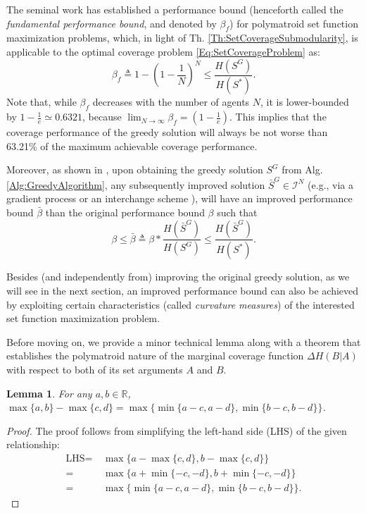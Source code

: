 \documentclass[letterpaper, 10 pt, conference]{ieeeconf}
\newcommand{\R}{\mathbb{R}}
\newtheorem{lemma}{Lemma}
\begin{document}
The seminal work \cite{Nemhauser1978} has established a performance bound (henceforth called the \emph{fundamental performance bound}, and denoted by $\beta_f$) for polymatroid set function maximization problems, which, in light of Th. \ref{Th:SetCoverageSubmodularity}, is applicable to the optimal coverage problem \eqref{Eq:SetCoverageProblem} as: 
\begin{equation}\label{Eq:FundamentalPerformanceBound}
    \beta_f \triangleq 1-\left(1-\frac{1}{N}\right)^N \leq \frac{H(S^G)}{H(S^*)}.
\end{equation}
Note that, while $\beta_f$ decreases with the number of agents $N$, it is lower-bounded by $1-\frac{1}{e} \simeq 0.6321$, because $\lim_{N\rightarrow\infty} \beta_f = (1-\frac{1}{e})$. This implies that the coverage performance of the greedy solution will always be not worse than 63.21\% of the maximum achievable coverage performance.

Moreover, as shown in \cite{WelikalaJ02021}, upon obtaining the greedy solution $S^G$ from Alg. \ref{Alg:GreedyAlgorithm}, any subsequently improved solution $\bar{S}^G\in\mathcal{I}^N$ (e.g., via a gradient process \cite{Sun2019,Sun2020} or an interchange scheme \cite{Welikala2019P3}), will have an improved performance bound $\bar{\beta}$ than the original performance bound $\beta$ such that  
$$\beta \leq \bar{\beta} \triangleq \beta * \frac{H(\bar{S}^G)}{H(S^G)} \leq \frac{H(\bar{S}^G)}{H(S^*)}.$$ 

Besides (and independently from) improving the original greedy solution, as we will see in the next section, an improved performance bound can also be achieved by exploiting certain characteristics (called \emph{curvature measures}) of the interested set function maximization problem. 

Before moving on, we provide a minor technical lemma along with a theorem that establishes the polymatroid nature of the marginal coverage function $\Delta H (B \vert A)$ with respect to both of its set arguments $A$ and $B$. 

\begin{lemma}\label{Lm:MaxMinusMax}
For any $a,b \in \R$, $\max \{a,b\} - \max\{c,d\} = \max\{\min\{a-c,a-d\},\min\{b-c,b-d\}\}$.
\end{lemma}
\begin{proof}
The proof follows from simplifying the left-hand side (LHS) of the given relationship:
\begin{align*}
\mbox{LHS} =&\ \max\{a-\max\{c,d\},b-\max\{c,d\}\}\\
=&\ \max\{a+\min\{-c,-d\},b+\min\{-c,-d\}\}\\
=&\ \max\{\min\{a-c,a-d\},\min\{b-c,b-d\}\}.
\end{align*}
\end{proof}
\end{document}
